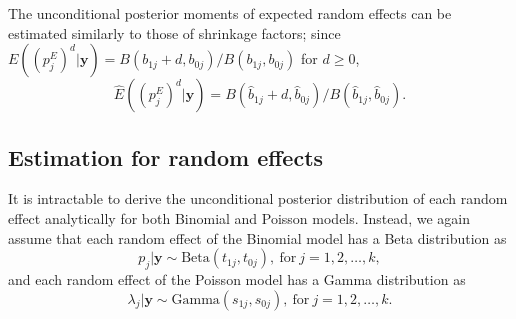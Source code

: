 \documentclass[article]{jss}
\begin{document}
The unconditional posterior moments of expected random effects can be estimated similarly to those of shrinkage factors; since $E((p^E_{j})^d\vert\boldsymbol{y})=B(b_{1j} + d, b_{0j})/B(b_{1j}, b_{0j})$ for $d\ge0$, 
\begin{equation}\label{priormeanmoments}
\widehat{E}((p^E_{j})^d\vert\boldsymbol{y})= B(\hat{b}_{1j} + d, \hat{b}_{0j})/B(\hat{b}_{1j}, \hat{b}_{0j}).
\end{equation}



\subsection{Estimation for random effects}
It is intractable to derive the unconditional posterior distribution of each random effect analytically for both Binomial and Poisson models. Instead, we again assume that each random effect of the Binomial model has a Beta distribution as 
\begin{equation}\label{truebeta}
p_j\vert \boldsymbol{y} \sim \textrm{Beta}(t_{1j}, t_{0j}),~\textrm{for}~ j=1, 2, \ldots, k,
\end{equation}
and each random effect of the Poisson model has a Gamma distribution as
\begin{equation}\label{truebeta_poisson}
\lambda_j\vert \boldsymbol{y} \sim \textrm{Gamma}(s_{1j}, s_{0j}),~\textrm{for}~ j=1, 2, \ldots, k.
\end{equation}
\end{document}
